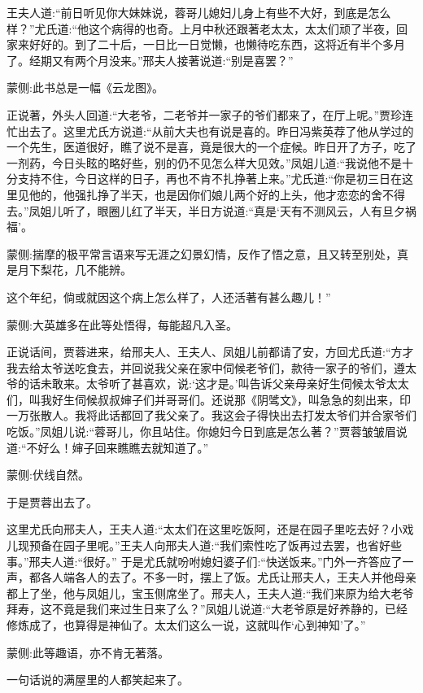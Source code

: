 \begin{parag}
    王夫人道:“前日听见你大妹妹说，蓉哥儿媳妇儿身上有些不大好，到底是怎么样？”尤氏道:“他这个病得的也奇。上月中秋还跟著老太太，太太们顽了半夜，回家来好好的。到了二十后，一日比一日觉懒，也懒待吃东西，这将近有半个多月了。经期又有两个月没来。”邢夫人接著说道:“别是喜罢？”\begin{note}蒙侧:此书总是一幅《云龙图》。\end{note}
\end{parag}


\begin{parag}
    正说著，外头人回道:“大老爷，二老爷并一家子的爷们都来了，在厅上呢。”贾珍连忙出去了。这里尤氏方说道:“从前大夫也有说是喜的。昨日冯紫英荐了他从学过的一个先生，医道很好，瞧了说不是喜，竟是很大的一个症候。昨日开了方子，吃了一剂药，今日头眩的略好些，别的仍不见怎么样大见效。”凤姐儿道:“我说他不是十分支持不住，今日这样的日子，再也不肯不扎挣著上来。”尤氏道:“你是初三日在这里见他的，他强扎挣了半天，也是因你们娘儿两个好的上头，他才恋恋的舍不得去。”凤姐儿听了，眼圈儿红了半天，半日方说道:“真是‘天有不测风云，人有旦夕祸福’。\begin{note}蒙侧:揣摩的极平常言语来写无涯之幻景幻情，反作了悟之意，且又转至别处，真是月下梨花，几不能辨。\end{note}这个年纪，倘或就因这个病上怎么样了，人还活著有甚么趣儿！”\begin{note}蒙侧:大英雄多在此等处悟得，每能超凡入圣。\end{note}正说话间，贾蓉进来，给邢夫人、王夫人、凤姐儿前都请了安，方回尤氏道:“方才我去给太爷送吃食去，并回说我父亲在家中伺候老爷们，款待一家子的爷们，遵太爷的话未敢来。太爷听了甚喜欢，说:‘这才是。’叫告诉父亲母亲好生伺候太爷太太们，叫我好生伺候叔叔婶子们并哥哥们。还说那《阴骘文》，叫急急的刻出来，印一万张散人。我将此话都回了我父亲了。我这会子得快出去打发太爷们并合家爷们吃饭。”凤姐儿说:“蓉哥儿，你且站住。你媳妇今日到底是怎么著？”贾蓉皱皱眉说道:“不好么！婶子回来瞧瞧去就知道了。”\begin{note}蒙侧:伏线自然。\end{note}于是贾蓉出去了。
\end{parag}


\begin{parag}
    这里尤氏向邢夫人，王夫人道:“太太们在这里吃饭阿，还是在园子里吃去好？小戏儿现预备在园子里呢。”王夫人向邢夫人道:“我们索性吃了饭再过去罢，也省好些事。”邢夫人道:“很好。” 于是尤氏就吩咐媳妇婆子们:“快送饭来。”门外一齐答应了一声，都各人端各人的去了。不多一时，摆上了饭。尤氏让邢夫人，王夫人并他母亲都上了坐，他与凤姐儿，宝玉侧席坐了。邢夫人，王夫人道:“我们来原为给大老爷拜寿，这不竟是我们来过生日来了么？”凤姐儿说道:“大老爷原是好养静的，已经修炼成了，也算得是神仙了。太太们这么一说，这就叫作‘心到神知’了。”\begin{note}蒙侧:此等趣语，亦不肯无著落。\end{note}一句话说的满屋里的人都笑起来了。
\end{parag}



